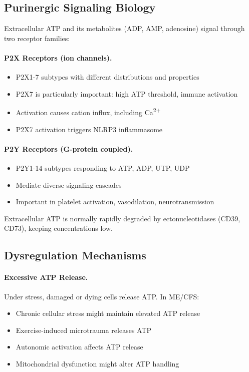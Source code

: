 \subsection{Purinergic Signaling Biology}

Extracellular ATP and its metabolites (ADP, AMP, adenosine) signal through two receptor families:

\paragraph{P2X Receptors (ion channels).}
\begin{itemize}
    \item P2X1-7 subtypes with different distributions and properties
    \item P2X7 is particularly important: high ATP threshold, immune activation
    \item Activation causes cation influx, including Ca\textsuperscript{2+}
    \item P2X7 activation triggers NLRP3 inflammasome
\end{itemize}

\paragraph{P2Y Receptors (G-protein coupled).}
\begin{itemize}
    \item P2Y1-14 subtypes responding to ATP, ADP, UTP, UDP
    \item Mediate diverse signaling cascades
    \item Important in platelet activation, vasodilation, neurotransmission
\end{itemize}

Extracellular ATP is normally rapidly degraded by ectonucleotidases (CD39, CD73), keeping concentrations low.

\subsection{Dysregulation Mechanisms}

\paragraph{Excessive ATP Release.} Under stress, damaged or dying cells release ATP. In ME/CFS:
\begin{itemize}
    \item Chronic cellular stress might maintain elevated ATP release
    \item Exercise-induced microtrauma releases ATP
    \item Autonomic activation affects ATP release
    \item Mitochondrial dysfunction might alter ATP handling
\end{itemize}

